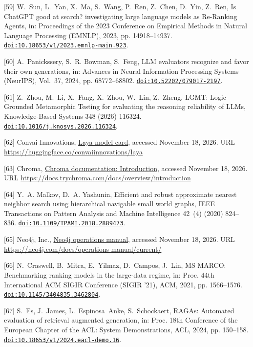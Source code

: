 [59] W.~Sun, L.~Yan, X.~Ma, S.~Wang, P.~Ren, Z.~Chen, D.~Yin, Z.~Ren, Is {ChatGPT} good at search? investigating large language models as {Re-Ranking Agents}, in: Proceedings of the 2023 Conference on Empirical Methods in Natural Language Processing (EMNLP), 2023, pp. 14918--14937. \href {https://doi.org/10.18653/v1/2023.emnlp-main.923} {\texttt{doi:10.18653/v1/2023.emnlp-main.923}}.

[60] A.~Panickssery, S.~R. Bowman, S.~Feng, {LLM} evaluators recognize and favor their own generations, in: Advances in Neural Information Processing Systems (NeurIPS), Vol.~37, 2024, pp. 68772--68802. \href {https://doi.org/10.52202/079017-2197} {\texttt{doi:10.52202/079017-2197}}.

[61] Z.~Zhou, M.~Li, X.~Fang, X.~Zhou, W.~Lin, Z.~Zheng, {LGMT: Logic-Grounded Metamorphic Testing for evaluating the reasoning reliability of LLMs}, Knowledge-Based Systems 348 (2026) 116324. \href {https://doi.org/10.1016/j.knosys.2026.116324} {\texttt{doi:10.1016/j.knosys.2026.116324}}.

[62] {Convai Innovations}, \href{https://huggingface.co/convaiinnovations/laya}{Laya model card}, accessed November 18, 2026. URL \url{https://huggingface.co/convaiinnovations/laya}

[63] {Chroma}, \href{https://docs.trychroma.com/docs/overview/introduction}{Chroma documentation: Introduction}, accessed November 18, 2026. URL \url{https://docs.trychroma.com/docs/overview/introduction}

[64] Y.~A. Malkov, D.~A. Yashunin, Efficient and robust approximate nearest neighbor search using hierarchical navigable small world graphs, IEEE Transactions on Pattern Analysis and Machine Intelligence 42~(4) (2020) 824--836. \href {https://doi.org/10.1109/TPAMI.2018.2889473} {\texttt{doi:10.1109/TPAMI.2018.2889473}}.

[65] {Neo4j, Inc.}, \href{https://neo4j.com/docs/operations-manual/current/}{{Neo4j} operations manual}, accessed November 18, 2026. URL \url{https://neo4j.com/docs/operations-manual/current/}

[66] N.~Craswell, B.~Mitra, E.~Yilmaz, D.~Campos, J.~Lin, {MS MARCO}: Benchmarking ranking models in the large-data regime, in: Proc. 44th International ACM SIGIR Conference (SIGIR '21), ACM, 2021, pp. 1566--1576. \href {https://doi.org/10.1145/3404835.3462804} {\texttt{doi:10.1145/3404835.3462804}}.

[67] S.~Es, J.~James, L.~Espinosa~Anke, S.~Schockaert, {RAGAs}: Automated evaluation of retrieval augmented generation, in: Proc. 18th Conference of the European Chapter of the ACL: System Demonstrations, ACL, 2024, pp. 150--158. \href {https://doi.org/10.18653/v1/2024.eacl-demo.16} {\texttt{doi:10.18653/v1/2024.eacl-demo.16}}.

